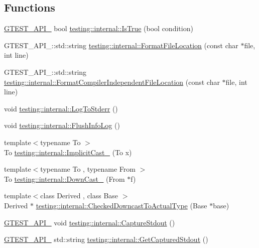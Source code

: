 \subsection*{Functions}
\begin{DoxyCompactItemize}
\item 
\hyperlink{gtest-port_8h_aa73be6f0ba4a7456180a94904ce17790}{G\+T\+E\+S\+T\+\_\+\+A\+P\+I\+\_\+} bool \hyperlink{namespacetesting_1_1internal_ab2709373c78eb8b1c22a6ba30cceba52}{testing\+::internal\+::\+Is\+True} (bool condition)
\item 
G\+T\+E\+S\+T\+\_\+\+A\+P\+I\+\_\+\+::std\+::string \hyperlink{namespacetesting_1_1internal_aea0ca448425df26e868a7d9447b9b7a1}{testing\+::internal\+::\+Format\+File\+Location} (const char $\ast$file, int line)
\item 
G\+T\+E\+S\+T\+\_\+\+A\+P\+I\+\_\+\+::std\+::string \hyperlink{namespacetesting_1_1internal_a882004bab0e3f0d1e9c913ae4e7fae50}{testing\+::internal\+::\+Format\+Compiler\+Independent\+File\+Location} (const char $\ast$file, int line)
\item 
void \hyperlink{namespacetesting_1_1internal_a06b1b20029fbd1dbeb59752f914fab84}{testing\+::internal\+::\+Log\+To\+Stderr} ()
\item 
void \hyperlink{namespacetesting_1_1internal_a2135f223bf6b527729aeaa651115183b}{testing\+::internal\+::\+Flush\+Info\+Log} ()
\item 
{\footnotesize template$<$typename To $>$ }\\To \hyperlink{namespacetesting_1_1internal_a982df3f369643b175f79cda4048bc3b9}{testing\+::internal\+::\+Implicit\+Cast\+\_\+} (To x)
\item 
{\footnotesize template$<$typename To , typename From $>$ }\\To \hyperlink{namespacetesting_1_1internal_a1a1a1aed3fe00908b8a45d5ab4a33665}{testing\+::internal\+::\+Down\+Cast\+\_\+} (From $\ast$f)
\item 
{\footnotesize template$<$class Derived , class Base $>$ }\\Derived $\ast$ \hyperlink{namespacetesting_1_1internal_abfe9bfb020d38aa4e0e12c001911b22b}{testing\+::internal\+::\+Checked\+Downcast\+To\+Actual\+Type} (Base $\ast$base)
\item 
\hyperlink{gtest-port_8h_aa73be6f0ba4a7456180a94904ce17790}{G\+T\+E\+S\+T\+\_\+\+A\+P\+I\+\_\+} void \hyperlink{namespacetesting_1_1internal_acba06d4f0343dec407738ba5544af990}{testing\+::internal\+::\+Capture\+Stdout} ()
\item 
\hyperlink{gtest-port_8h_aa73be6f0ba4a7456180a94904ce17790}{G\+T\+E\+S\+T\+\_\+\+A\+P\+I\+\_\+} std\+::string \hyperlink{namespacetesting_1_1internal_aed657219a9856a8d249a3230de0c54ce}{testing\+::internal\+::\+Get\+Captured\+Stdout} ()

\end{DoxyCompactItemize}
